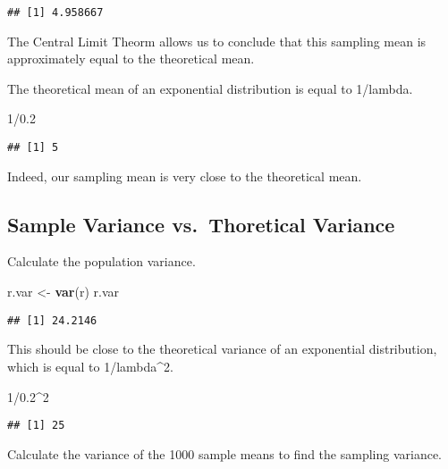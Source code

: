 \documentclass[]{article}
\newenvironment{Shaded}{\begin{snugshade}}{\end{snugshade}}
\newcommand{\KeywordTok}[1]{\textcolor[rgb]{0.13,0.29,0.53}{\textbf{{#1}}}}
\newcommand{\DecValTok}[1]{\textcolor[rgb]{0.00,0.00,0.81}{{#1}}}
\newcommand{\FloatTok}[1]{\textcolor[rgb]{0.00,0.00,0.81}{{#1}}}
\newcommand{\StringTok}[1]{\textcolor[rgb]{0.31,0.60,0.02}{{#1}}}
\newcommand{\NormalTok}[1]{{#1}}
\begin{document}
\begin{verbatim}
## [1] 4.958667
\end{verbatim}

The Central Limit Theorm allows us to conclude that this sampling mean
is approximately equal to the theoretical mean.

The theoretical mean of an exponential distribution is equal to
1/lambda.

\begin{Shaded}
\begin{Highlighting}[]
\DecValTok{1}\NormalTok{/}\FloatTok{0.2}
\end{Highlighting}
\end{Shaded}

\begin{verbatim}
## [1] 5
\end{verbatim}

Indeed, our sampling mean is very close to the theoretical mean.

\subsection{Sample Variance vs.~Thoretical
Variance}\label{sample-variance-vs.thoretical-variance}

Calculate the population variance.

\begin{Shaded}
\begin{Highlighting}[]
\NormalTok{r.var <-}\StringTok{ }\KeywordTok{var}\NormalTok{(r)}
\NormalTok{r.var}
\end{Highlighting}
\end{Shaded}

\begin{verbatim}
## [1] 24.2146
\end{verbatim}

This should be close to the theoretical variance of an exponential
distribution, which is equal to 1/lambda\^{}2.

\begin{Shaded}
\begin{Highlighting}[]
\DecValTok{1}\NormalTok{/}\FloatTok{0.2}\NormalTok{^}\DecValTok{2}
\end{Highlighting}
\end{Shaded}

\begin{verbatim}
## [1] 25
\end{verbatim}

Calculate the variance of the 1000 sample means to find the sampling
variance.
\end{document}
